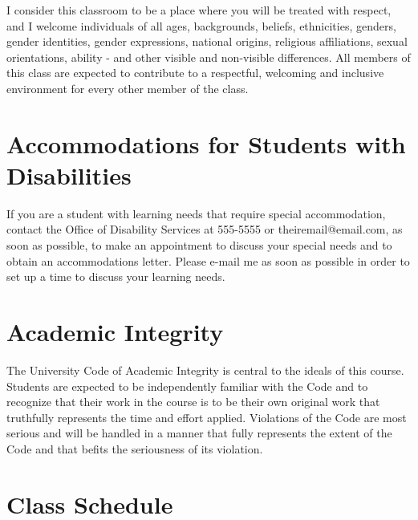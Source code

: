 \documentclass[a4paper]{inzane_syllabus} %
\begin{document}
I consider this classroom to be a place where you will be treated with respect,
and I welcome individuals of all ages, backgrounds, beliefs, ethnicities,
genders, gender identities, gender expressions, national origins, religious
affiliations, sexual orientations, ability - and other visible and non-visible
differences. All members of this class are expected to contribute to a
respectful, welcoming and inclusive environment for every other member of
the class. 

\vspace{0.5cm}
\section{Accommodations for Students with Disabilities}

If you are a student with learning needs that require special accommodation,
contact the Office of Disability Services at 555-5555 or theiremail@email.com,
as soon as possible, to make an appointment to discuss your special needs and
to obtain an accommodations letter.  Please e-mail me as soon as possible in
order to set up a time to discuss your learning needs.

\vspace{0.5cm}
\section{Academic Integrity}

The University Code of Academic Integrity is central to the ideals of this
course. Students are expected to be independently familiar with the Code and to
recognize that their work in the course is to be their own original work that
truthfully represents the time and effort applied.  Violations of the Code are
most serious and will be handled in a manner that fully represents the extent
of the Code and that befits the seriousness of its violation.\\


\newpage
\makeFullPage
\section{Class Schedule}
\end{document}

